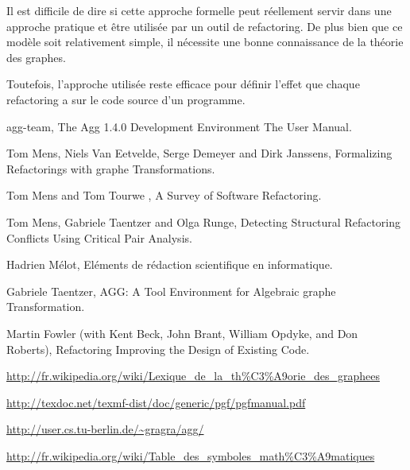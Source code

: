 \documentclass[a4paper, 12pt]{article}
\begin{document}
  Il est difficile de dire si cette approche formelle peut réellement servir dans une approche pratique et être utilisée par un outil de refactoring.
  De plus bien que ce modèle soit relativement simple, il nécessite une bonne connaissance de la théorie des graphes.

  Toutefois, l'approche utilisée reste efficace pour définir l'effet que chaque refactoring a sur le code source d'un programme.

  \newpage

  \begin{thebibliography}{9}

    agg-team,
    The Agg 1.4.0 Development Environment The User Manual.

    Tom Mens, Niels Van Eetvelde, Serge Demeyer and Dirk Janssens,
    Formalizing Refactorings with graphe Transformations.

    Tom Mens and Tom Tourwe ,
    A Survey of Software Refactoring.

    Tom Mens, Gabriele Taentzer and Olga Runge,
    Detecting Structural Refactoring Conflicts Using Critical Pair Analysis.

    Hadrien Mélot,
    Eléments de rédaction scientifique en informatique.

    Gabriele Taentzer,
    AGG: A Tool Environment for Algebraic graphe Transformation.

    Martin Fowler (with Kent Beck, John Brant, William Opdyke, and Don Roberts),
    Refactoring Improving the Design of Existing Code.

    \url{http://fr.wikipedia.org/wiki/Lexique_de_la_th%C3%A9orie_des_graphees}

    \url{http://texdoc.net/texmf-dist/doc/generic/pgf/pgfmanual.pdf}

    \url{http://user.cs.tu-berlin.de/~gragra/agg/}

    \url{http://fr.wikipedia.org/wiki/Table_des_symboles_math%C3%A9matiques}

  \end{thebibliography}
\end{document}
